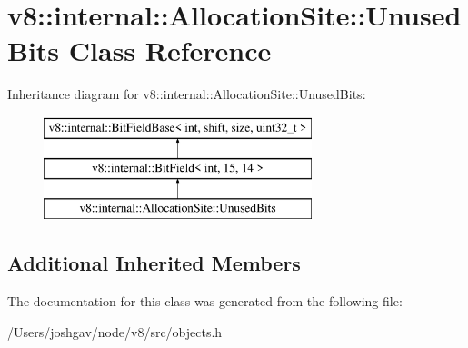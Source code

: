 \hypertarget{classv8_1_1internal_1_1_allocation_site_1_1_unused_bits}{}\section{v8\+:\+:internal\+:\+:Allocation\+Site\+:\+:Unused\+Bits Class Reference}
\label{classv8_1_1internal_1_1_allocation_site_1_1_unused_bits}
Inheritance diagram for v8\+:\+:internal\+:\+:Allocation\+Site\+:\+:Unused\+Bits\+:\begin{figure}[H]
\begin{center}
\leavevmode
\includegraphics[height=3.000000cm]{classv8_1_1internal_1_1_allocation_site_1_1_unused_bits}
\end{center}
\end{figure}
\subsection*{Additional Inherited Members}


The documentation for this class was generated from the following file\+:\begin{DoxyCompactItemize}
\item 
/\+Users/joshgav/node/v8/src/objects.\+h\end{DoxyCompactItemize}

